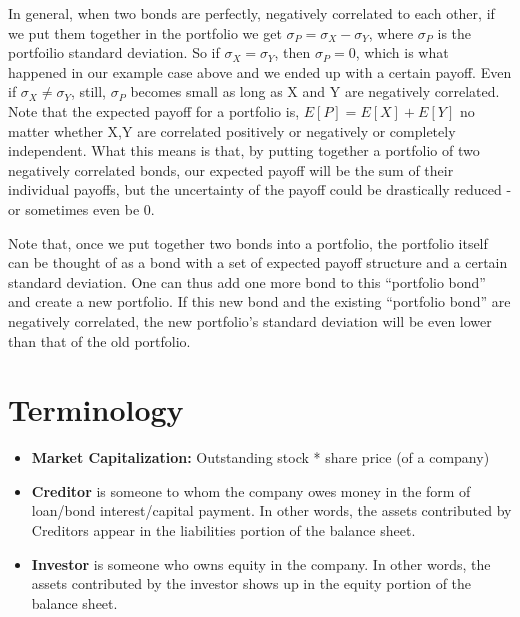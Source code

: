 In general, when two bonds are perfectly, negatively correlated to each other, if we put them together in the portfolio we get \( \sigma_P = \sigma_X - \sigma_Y \), where \( \sigma_P \) is the portfoilio standard deviation. So if \( \sigma_X = \sigma_Y \), then \( \sigma_P = 0\), which is what happened in our example case above and we ended up with a certain payoff. Even if  \( \sigma_X \neq \sigma_Y \), still, \( \sigma_P \) becomes small as long as X and Y are negatively correlated. Note that the expected payoff for a portfolio is, \( E[P] = E[X] + E[Y] \) no matter whether X,Y are correlated positively or negatively or completely independent. What this means is that, by putting together a portfolio of two negatively correlated bonds, our expected payoff will be the sum of their individual payoffs, but the uncertainty of the payoff could be drastically reduced - or sometimes even be 0. 

Note that, once we put together two bonds into a portfolio, the portfolio itself can be thought of as a bond with a set of expected payoff structure and a certain standard deviation. One can thus add one more bond to this ``portfolio bond'' and create a new portfolio. If this new bond and the existing ``portfolio bond'' are negatively correlated, the new portfolio's standard deviation will be even lower than that of the old portfolio. 
 
\section{Terminology}
	\begin{itemize}
	\item \textbf{Market Capitalization:} Outstanding stock * share price (of a company)
	\item \textbf{Creditor} is someone to whom the company owes money in the form of loan/bond interest/capital payment. In other words, the assets contributed by Creditors appear in the liabilities portion of the balance sheet.
	\item \textbf{Investor} is someone who owns equity in the company.  In other words, the assets contributed by the investor shows up in the equity portion of the balance sheet.
	\end{itemize}
	
